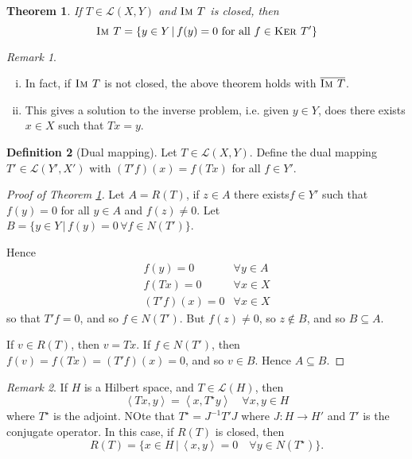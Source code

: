 \documentclass[10pt, oneside, reqno]{amsart}
\theoremstyle{plain}%
\newtheorem{thm}{Theorem}[section]
\numberwithin{equation}{section}
\theoremstyle{definition}
\newtheorem{defn}[thm]{Definition}
\theoremstyle{remark}
\newtheorem*{rem}{Remark}
\newcommand{\given}{ \, | \,}
\newcommand{\El}{\mathcal{L}}
\newcommand{\im}{\textsc{Im\ }}
\renewcommand{\ker}{\textsc{Ker\ }}
\newcommand{\iprod}[1]{\left\langle #1 \right\rangle}
\begin{document}
\begin{thm}
	\label{thm:rangeclosed}
	If $T \in \El(X, Y)$ and $\im T$ is closed, then \[
		\im T = \{ y \in Y \given f(y) = 0 \text{ for all } f \in \ker T' \}
	\] 
\end{thm}

\begin{rem}{\ } 
	\begin{enumerate}[(i)]
		\item In fact, if $\im T$ is not closed, the above theorem holds with $\overline{\im T}$. 
		\item This gives a solution to the inverse problem, i.e. given $y \in Y$, does there exists $x \in X$ such that $Tx = y$.   
	\end{enumerate}
\end{rem}

\begin{defn}[Dual mapping]
	Let $T \in \El(X, Y)$. Define the dual mapping $T' \in \El(Y', X')$ with $(T'f)(x) = f(Tx)$ for all $f \in Y'$.  
\end{defn}

\begin{proof}[Proof of Theorem \ref{thm:rangeclosed}]
	Let $A = R(T)$, if $z \in A$ there exists$f \in Y'$ such that $f(y) = 0$ for all $y \in A$ and $f(z) \neq 0$.  Let $B = \{ y \in Y \given f(y) = 0 \, \forall f \in N(T') \}$.  
	
	Hence \begin{align*}
		f(y) = 0 &\forall y \in A \\
		f(Tx) = 0 &\forall x \in X \\
		(T'f)(x) = 0 &\forall x \in X
	\end{align*} so that $T'f = 0$, and so $f \in N(T')$.  But $f(z) \neq 0$, so $z \notin B$, and so $B \subseteq A$.  
	
	If $v \in R(T)$, then $v = Tx$.  If $f \in N(T')$, then $f(v) = f(Tx) = (T'f)(x) = 0$, and so $v \in B$.  Hence $A \subseteq B$.  \qedhere
\end{proof}

\begin{rem}
	If $H$ is a Hilbert space, and $T \in \mathcal L(H)$, then \[
		\iprod{Tx, y} = \iprod{x, T^\star y} \quad \forall x, y \in H
	\] where $T^\star$ is the adjoint.  NOte that $T^\star = J^{-1} T' J$ where $J: H \rightarrow H'$ and $T'$ is the conjugate operator.  In this case, if $R(T)$ is closed, then \[
		R(T) = \{ x \in H \given \iprod{x, y} = 0 \quad \forall y \in N(T^\star) \}.
	\]
\end{rem}
\end{document}
